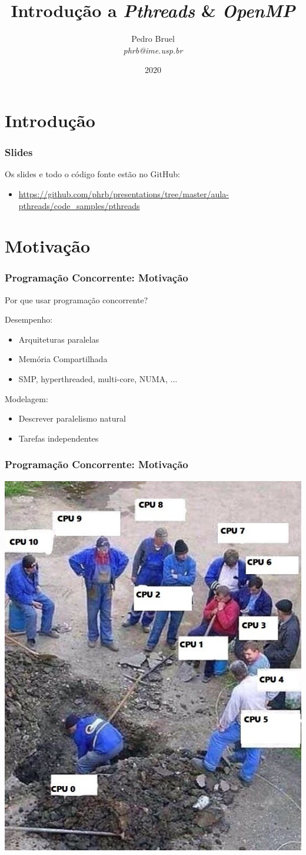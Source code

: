 \documentclass[10pt, compress, aspectratio=169, xcolor={table,usenames,dvipsnames}]{beamer}
\title{Introdução a \textit{Pthreads} \& \textit{OpenMP}}
\author{\footnotesize Pedro Bruel \\ {\scriptsize \emph{phrb@ime.usp.br}}}
\institute{{\large\Biohazard} Versão Quarentena}
\date{\scriptsize 2020}
\begin{document}
\maketitle

\section*{Introdução}

\begin{frame}
    \frametitle{Slides}
    Os slides e todo o código fonte estão no \alert{GitHub}:

    \begin{itemize}
        \item {\scriptsize\url{https://github.com/phrb/presentations/tree/master/aula-pthreads/code_samples/pthreads}}
    \end{itemize}
\end{frame}

\section{Motivação}

\begin{frame}
    \frametitle{Programação Concorrente: Motivação}
    Por que usar programação concorrente?

    \alert{Desempenho}:
    \begin{itemize}
        \item Arquiteturas paralelas
        \item Memória Compartilhada
        \item SMP, hyperthreaded, multi-core, NUMA, $\dots$
    \end{itemize}

    \alert{Modelagem}:
    \begin{itemize}
        \item Descrever paralelismo natural
        \item Tarefas independentes
    \end{itemize}
\end{frame}

\begin{frame}
    \frametitle{Programação Concorrente: Motivação}
    \begin{center}
        \includegraphics[width=.43\textwidth]{shared_work}
    \end{center}
\end{frame}
\end{document}
